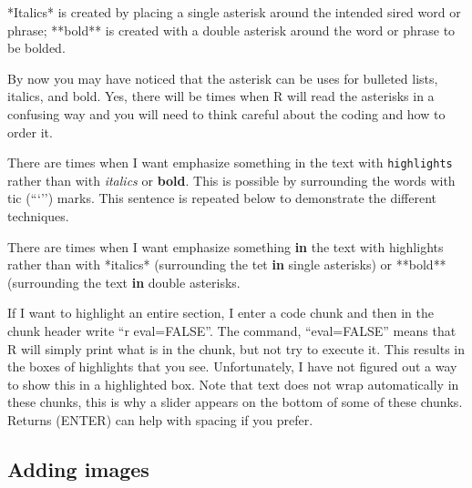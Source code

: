 \documentclass[
]{book}
\newenvironment{Shaded}{\begin{snugshade}}{\end{snugshade}}
\newcommand{\AttributeTok}[1]{\textcolor[rgb]{0.77,0.63,0.00}{#1}}
\newcommand{\ControlFlowTok}[1]{\textcolor[rgb]{0.13,0.29,0.53}{\textbf{#1}}}
\newcommand{\NormalTok}[1]{#1}
\newcommand{\SpecialCharTok}[1]{\textcolor[rgb]{0.00,0.00,0.00}{#1}}
\newcommand{\StringTok}[1]{\textcolor[rgb]{0.31,0.60,0.02}{#1}}
\begin{document}
\begin{Shaded}
\begin{Highlighting}[]
\SpecialCharTok{*}\NormalTok{Italics}\SpecialCharTok{*}\NormalTok{ is created by placing a single asterisk around the intended sired word or phrase; }\SpecialCharTok{**}\NormalTok{bold}\SpecialCharTok{**}\NormalTok{ is created with a double asterisk around the word or phrase to be bolded.}
\end{Highlighting}
\end{Shaded}

By now you may have noticed that the asterisk can be uses for bulleted lists, italics, and bold. Yes, there will be times when R will read the asterisks in a confusing way and you will need to think careful about the coding and how to order it.

There are times when I want emphasize something in the text with \texttt{highlights} rather than with \emph{italics} or \textbf{bold}. This is possible by surrounding the words with tic (```'') marks. This sentence is repeated below to demonstrate the different techniques.

\begin{Shaded}
\begin{Highlighting}[]
\NormalTok{There are times when I want emphasize something }\ControlFlowTok{in}\NormalTok{ the text with }\StringTok{\textasciigrave{}}\AttributeTok{highlights}\StringTok{\textasciigrave{}}\NormalTok{ rather than with }\SpecialCharTok{*}\NormalTok{italics}\SpecialCharTok{*}\NormalTok{ (surrounding the tet }\ControlFlowTok{in}\NormalTok{ single asterisks) or }\SpecialCharTok{**}\NormalTok{bold}\SpecialCharTok{**}\NormalTok{ (surrounding the text }\ControlFlowTok{in}\NormalTok{ double asterisks.}
\end{Highlighting}
\end{Shaded}

If I want to highlight an entire section, I enter a code chunk and then in the chunk header write ``r eval=FALSE''. The command, ``eval=FALSE'' means that R will simply print what is in the chunk, but not try to execute it. This results in the boxes of highlights that you see. Unfortunately, I have not figured out a way to show this in a highlighted box. Note that text does not wrap automatically in these chunks, this is why a slider appears on the bottom of some of these chunks. Returns (ENTER) can help with spacing if you prefer.

\hypertarget{adding-images}{%
\subsection{Adding images}\label{adding-images}}
\end{document}
